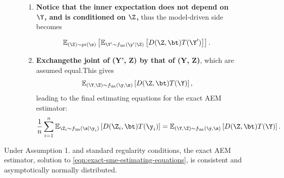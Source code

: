 \begin{figure}
\begin{tcolorbox}[colback=green!3!white, colframe=green!50!black, title=From the estimating equations of MLE to those of AEM]
\begin{enumerate}
    \item \textbf{Notice that the inner expectation does not depend on $\Y$, and is conditioned on $\Z$, }  thus the model-driven side becomes

    \[
    \mathbb{E}_{(\Z) \sim pi(\z)}
    \left[
        \mathbb{E}_{\Y' \sim f_\bt(\y' \mid \Z)}
        \left[
            D(\Z, \bt)
            T(\Y')
        \right]
    \right].
    \]
    
    \item \textbf{Exchangethe joint of (Y', Z) by that of (Y, Z)}, which are assumed equal.This gives
    \[
    \mathbb{E}_{(\Y, \Z) \sim f_\bt(\y, \z)}
    \left[
        D(\Z, \bt)
        T(\Y)
    \right],
    \]
    leading to the final estimating equations for the exact AEM estimator:
    \[
    \frac{1}{n} \sum_{i=1}^{n}
    \mathbb{E}_{\Z_i \sim f_\bt(\z \mid \y_i)}
    \left[
        D(\Z_i, \bt)
        T(\y_i)
    \right]
    =
    \mathbb{E}_{(\Y, \Z) \sim f_\bt(\y, \z)}
    \left[
        D(\Z, \bt)
        T(\Y)
    \right].
    \]
\end{enumerate}
\end{tcolorbox}
\end{figure}

\begin{lemma}
Under Assumption 1. and standard regularity conditions, the exact AEM estimator, solution to \eqref{eqn:exact-sme-estimating-equations}, is consistent and asymptotically normally distributed.
\end{lemma}

